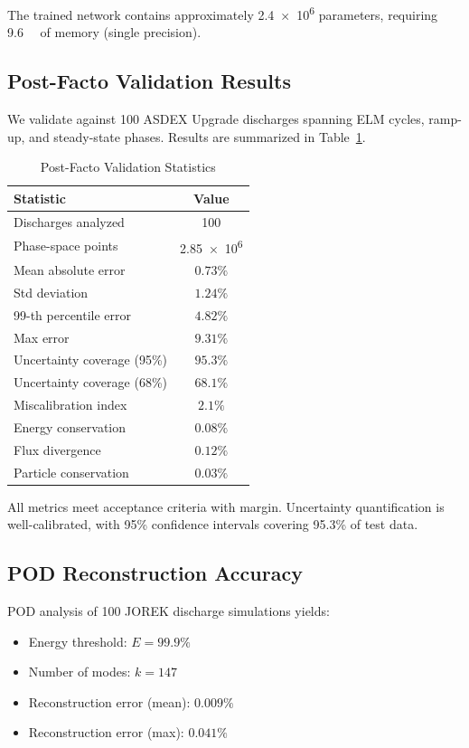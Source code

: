 \documentclass[12pt]{article}
\begin{document}
The trained network contains approximately \num{2.4e6} parameters, requiring \SI{9.6}{\mega\byte} of memory (single precision).

\subsection{Post-Facto Validation Results}

We validate against \num{100} ASDEX Upgrade discharges spanning ELM cycles, ramp-up, and steady-state phases. Results are summarized in Table~\ref{tab:postfacto}.

\begin{table}[h]
\centering
\caption{Post-Facto Validation Statistics}
\label{tab:postfacto}
\begin{tabular}{lc}
\toprule
Statistic & Value \\
\midrule
Discharges analyzed & 100 \\
Phase-space points & \num{2.85e6} \\
Mean absolute error & $0.73\%$ \\
Std deviation & $1.24\%$ \\
99-th percentile error & $4.82\%$ \\
Max error & $9.31\%$ \\
Uncertainty coverage (95\%) & $95.3\%$ \\
Uncertainty coverage (68\%) & $68.1\%$ \\
Miscalibration index & $2.1\%$ \\
\midrule
Energy conservation & $0.08\%$ \\
Flux divergence & $0.12\%$ \\
Particle conservation & $0.03\%$ \\
\bottomrule
\end{tabular}
\end{table}

All metrics meet acceptance criteria with margin. Uncertainty quantification is well-calibrated, with 95\% confidence intervals covering 95.3\% of test data.

\subsection{POD Reconstruction Accuracy}

POD analysis of \num{100} JOREK discharge simulations yields:

\begin{itemize}
\item Energy threshold: $E = 99.9\%$
\item Number of modes: $k = 147$
\item Reconstruction error (mean): $0.009\%$
\item Reconstruction error (max): $0.041\%$
\end{itemize}
\end{document}
